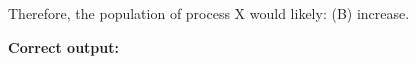 \begin{table*}[th!]
\begin{mybody}
Therefore, the population of process X would likely:
(B) increase.

\textbf{Correct output:} 
\end{mybody}
\fi 
\label{tab:commands_2}
\end{table*}











